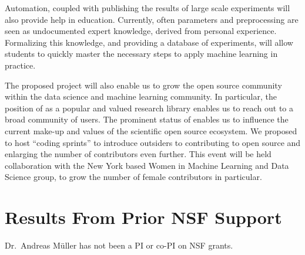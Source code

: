 Automation, coupled with publishing the results of large scale experiments will
also provide help in education. Currently, often parameters and preprocessing
are seen as undocumented expert knowledge, derived from personal experience.
Formalizing this knowledge, and providing a database of experiments, will allow
students to quickly master the necessary steps to apply machine learning in
practice.

The proposed project will also enable us to grow the open source community
within the data science and machine learning community.  In particular, the
position of \sklearn{} as a popular and valued research library enables us to
reach out to a broad community of users.  The prominent status of \sklearn{}
enables us to influence the current make-up and values of the scientific open
source ecosystem.  We proposed to host ``coding sprints'' to introduce
outsiders to contributing to open source and enlarging the number of
contributors even further. This event will be held collaboration with the New
York based Women in Machine Learning and Data Science group, to grow the number
of female contributors in particular. 


\section{Results From Prior NSF Support}
Dr.\ Andreas M\"uller has not been a PI or co-PI on NSF grants.



